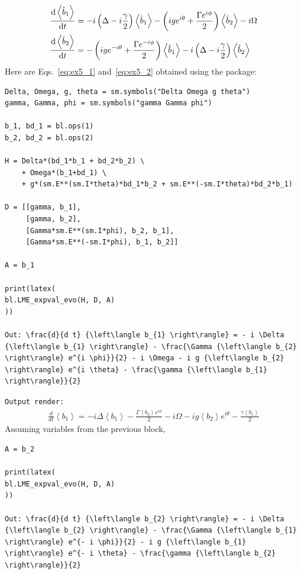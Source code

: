 \documentclass[onecolumn, 12pt, sort&compress]{elsarticle}
\newcommand{\inlinecode}[1]{\texttt{#1}}
\newcommand{\expval}[1]{\left\langle{#1}\right\rangle}
\newcommand{\bop}{\hat{b}}
\newenvironment{revision2}{%
\color{red}
}
{}
\begin{document}
\begin{subequations}
\begin{align}
        \odv{\expval{\bop_1}}{t} &=
    -i\left(\Delta -i \frac{\gamma}{2}\right)\expval{\bop_1}-\left(ige^{i\theta}+\frac{\Gamma e^{i\phi}}{2}\right)\expval{\bop_2}-i\Omega \label{eq:ex5_1}
    \\
    \odv{\expval{\bop_2}}{t} &=
    -\left(ige^{-i\theta}+\frac{\Gamma e^{-i\phi}}{2}\right)\expval{\bop_1}-i\left(\Delta-i\frac{\gamma}{2}\right)\expval{\bop_2}\label{eq:ex5_2}
\end{align}
\end{subequations}
Here are Eqs.~\eqref{eq:ex5_1} and~\eqref{eq:ex5_2} obtained using the package:
\begin{verbatim}
Delta, Omega, g, theta = sm.symbols("Delta Omega g theta")
gamma, Gamma, phi = sm.symbols("gamma Gamma phi")

b_1, bd_1 = bl.ops(1)
b_2, bd_2 = bl.ops(2)

H = Delta*(bd_1*b_1 + bd_2*b_2) \
    + Omega*(b_1+bd_1) \
    + g*(sm.E**(sm.I*theta)*bd_1*b_2 + sm.E**(-sm.I*theta)*bd_2*b_1)

D = [[gamma, b_1],
     [gamma, b_2],
     [Gamma*sm.E**(sm.I*phi), b_2, b_1],
     [Gamma*sm.E**(-sm.I*phi), b_1, b_2]]

A = b_1

print(latex(
bl.LME_expval_evo(H, D, A)
))

Out: \frac{d}{d t} {\left\langle b_{1} \right\rangle} = - i \Delta {\left\langle b_{1} \right\rangle} - \frac{\Gamma {\left\langle b_{2} \right\rangle} e^{i \phi}}{2} - i \Omega - i g {\left\langle b_{2} \right\rangle} e^{i \theta} - \frac{\gamma {\left\langle b_{1} \right\rangle}}{2}
\end{verbatim}
\begin{revision2}
\inlinecode{Output render:}
\begin{align*}
\frac{d}{d t} {\left\langle b_{1} \right\rangle} = - i \Delta {\left\langle b_{1} \right\rangle} - \frac{\Gamma {\left\langle b_{2} \right\rangle} e^{i \phi}}{2} - i \Omega - i g {\left\langle b_{2} \right\rangle} e^{i \theta} - \frac{\gamma {\left\langle b_{1} \right\rangle}}{2}
\end{align*}
\end{revision2}
Assuming variables from the previous block,
\begin{verbatim}
A = b_2

print(latex(
bl.LME_expval_evo(H, D, A)
))

Out: \frac{d}{d t} {\left\langle b_{2} \right\rangle} = - i \Delta {\left\langle b_{2} \right\rangle} - \frac{\Gamma {\left\langle b_{1} \right\rangle} e^{- i \phi}}{2} - i g {\left\langle b_{1} \right\rangle} e^{- i \theta} - \frac{\gamma {\left\langle b_{2} \right\rangle}}{2}
\end{verbatim}
\end{document}
